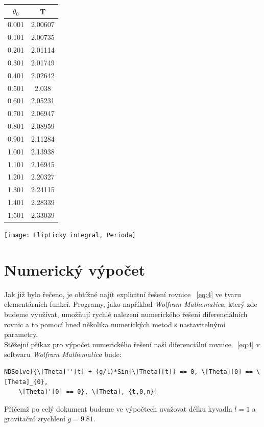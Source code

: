 \documentclass[reqno, a4paper]{amsart}
\begin{document}
\begin{minipage}{\textwidth}
\begin{minipage}[b]{0.2\textwidth}
\centering
\begin{tabular}{|c|c|}
\hline
$\theta_{0}$ & T \\ 
\hline
0.001& 2.00607\\0.101& 2.00735\\0.201& 2.01114\\0.301& 2.01749\\0.401& 2.02642\\0.501& 2.038\\0.601& 2.05231\\0.701& 2.06947\\0.801& 2.08959\\0.901& 2.11284\\
1.001& 2.13938\\1.101& 2.16945\\1.201& 2.20327\\1.301& 2.24115\\1.401& 2.28339\\1.501& 2.33039\\
\hline
\end{tabular}
\end{minipage}
\begin{minipage}[b]{0.79\textwidth}
\centering
\texttt{[image: Elipticky integral, Perioda]}
\end{minipage}
\hfill
\end{minipage}

\section{Numerický výpočet}
Jak již bylo řečeno, je obtížné najít explicitní řešení rovnice ~\eqref{eq:4} ve tvaru elementárních funkcí. Programy, jako například \textit{Wolfram Mathematica}, který zde budeme využívat, umožňují rychlé nalezení numerického řešení diferenciálních rovnic a to pomocí hned několika numerických metod s nastavitelnými parametry.\
\\
Stěžejní příkaz pro výpočet numerického řešení naší diferenciální rovnice ~\eqref{eq:4} v softwaru \textit{Wolfram Mathematica} bude:
\begin{verbatim}
NDSolve[{\[Theta]''[t] + (g/l)*Sin[\[Theta][t]] == 0, \[Theta][0] == \[Theta]_{0}, 
	\[Theta]'[0] == 0}, \[Theta], {t,0,n}]
\end{verbatim}
Přičemž po celý dokument budeme ve výpočtech uvažovat délku kyvadla $ l=1 $ a gravitační zrychlení $ g=9.81 $.
\end{document}
